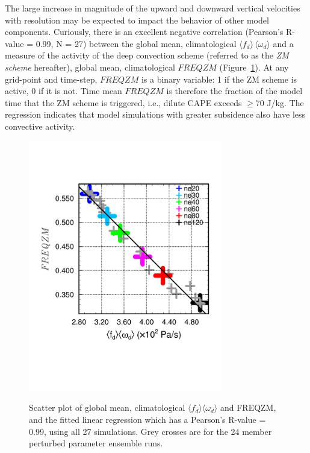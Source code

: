 \documentclass[times]{qjrms4}
\begin{document}
The large increase in magnitude of the upward and downward vertical velocities with resolution may be expected to impact the behavior of other model components. Curiously, there is an excellent negative correlation (Pearson's R-value = 0.99, N = 27) between the global mean, climatological $\langle f_{d} \rangle \, \langle \omega_{d} \rangle$ and a measure of the activity of the \cite{ZM1995AO} deep convection scheme (referred to as the {\em{ZM scheme}} hereafter), global mean, climatological $FREQZM$ (Figure~\ref{fig:corr}). At any grid-point and time-step, $FREQZM$ is a binary variable: 1 if the ZM scheme is active, 0 if it is not. Time mean $FREQZM$ is therefore the fraction of the model time that the ZM scheme is triggered, i.e., dilute CAPE exceeds $\geq 70$ J/kg. The regression indicates that model simulations with greater subsidence also have less convective activity.

\begin{figure}
\begin{center}
\noindent\includegraphics[width=20pc,angle=0]{figs/temp_diags_corr.pdf}\\
\end{center}
\caption{Scatter plot of global mean, climatological $\langle f_{d} \rangle \langle \omega_{d} \rangle$ and FREQZM, and the fitted linear regression which has a Pearson's R-value = 0.99, using all 27 simulations. Grey crosses are for the 24 member perturbed parameter ensemble runs.}
\label{fig:corr}
\end{figure}
\end{document}
